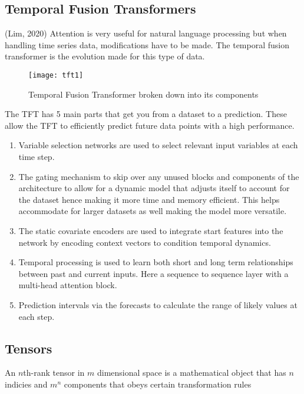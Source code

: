 \documentclass{article}
\begin{document}
\subsection{Temporal Fusion Transformers}
(Lim, 2020)
Attention is very useful for natural language processing but when handling time series data,
modifications have to be made. The temporal fusion transformer is the evolution made for this
type of data.
\begin{figure}[h!]
    \centering
    \texttt{[image: tft1]}
    \caption{Temporal Fusion Transformer broken down into its components}
\end{figure}
The TFT has 5 main parts that get you from a dataset to a prediction. These allow the TFT to
efficiently predict future data points with a high performance.
\begin{enumerate}
\item Variable selection networks are used to select relevant input variables at each time step.
\item The gating mechanism to skip over any unused blocks and components of the architecture to allow for a dynamic model that adjusts itself to account for the dataset hence making it more time and memory efficient. This helps accommodate for larger datasets as well making the model more versatile.
\item The static covariate encoders are used to integrate start features into the network by encoding context vectors to condition temporal dynamics.
\item Temporal processing is used to learn both short and long term relationships between past and current inputs. Here a sequence to sequence layer with a multi-head attention block.
\item Prediction intervals via the forecasts to calculate the range of likely values at each step.
\end{enumerate}

\subsection{Tensors}
An $n$th-rank tensor in $m$ dimensional space is a mathematical object that has $n$ indicies and $m^n$ components that obeys certain transformation rules
\end{document}
